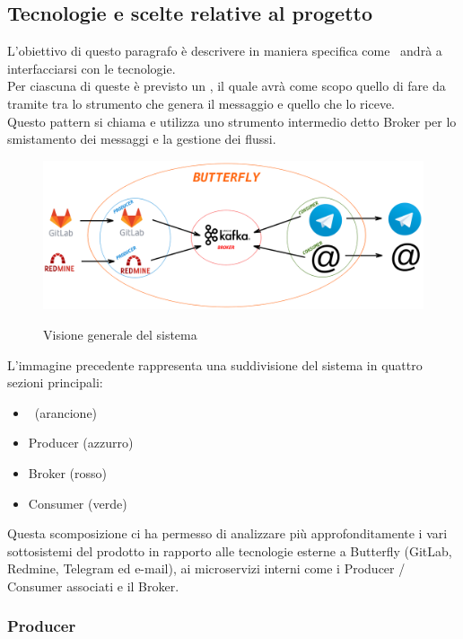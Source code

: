 \subsection{Tecnologie e scelte relative al progetto}
	L'obiettivo di questo paragrafo è descrivere in maniera specifica come \progetto\ andrà a interfacciarsi con le tecnologie.\\
	Per ciascuna di queste è previsto un , il quale avrà come scopo quello di fare da tramite tra lo strumento che genera il messaggio e quello che lo riceve.\\
	Questo pattern si chiama  e utilizza uno strumento intermedio detto Broker per lo smistamento dei messaggi e la gestione dei flussi.

	\begin{figure}[H]
		\centering
		\includegraphics[width=\textwidth]{img/butterfly.png}\\
		\caption{Visione generale del sistema \progetto}
		\label{fig:butterfly}
	\end{figure}
	L'immagine precedente rappresenta una suddivisione del sistema in quattro sezioni principali:
	\begin{itemize}
		\item \progetto\ (arancione)
		\item Producer (azzurro)
		\item Broker (rosso)
		\item Consumer (verde)
	\end{itemize}
	Questa scomposizione ci ha permesso di analizzare più approfonditamente i vari sottosistemi del prodotto in rapporto alle tecnologie esterne a Butterfly (GitLab, Redmine, Telegram ed e-mail), ai microservizi interni come i Producer / Consumer associati e il Broker.
	
	\subsubsection{Producer}
	
